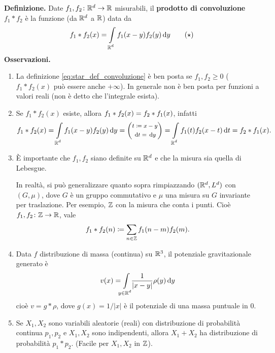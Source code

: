 \documentclass[a4paper, 12pt]{report}
\begin{document}
\textbf{Definizione.} Date $f_1,f_2 \colon  \mathbb R^d \to \mathbb R$ misurabili, il \textbf{prodotto di convoluzione} $f_1 \ast f_2$ è la funzione (da $\mathbb R^d$ a $\mathbb R$) data da
%
\begin{equation} \label{eq:star_def_convoluzione}
	f_1 \ast f_2(x) = \int\limits_{\mathclap{\R^d}} f_1(x-y) f_2(y) \dd y
	\tag{$\star$}
\end{equation}
%
\textbf{Osservazioni.}
\begin{enumerate}
\item La definizione \eqref{eq:star_def_convoluzione} è ben posta se $f_1,f_2 \geq 0$ ($f_1 \ast f_2(x)$ può essere anche $+\infty$).
In generale non è ben posta per funzioni a valori reali (non è detto che l'integrale esista).

\item Se $f_1 \ast f_2(x)$ esiste, allora $\displaystyle f_1 \ast f_2(x) = f_2 \ast f_1(x)$, infatti
%
$$
f_1 \ast f_2 (x) 
= \int\limits_{\mathclap{\R^d}} f_1(x-y) f_2(y) \dd y 
= \left( 
{\footnotesize \begin{gathered}
	t \coloneqq x - y \\ 
	\dd t = \dd y
\end{gathered}}
\right) =
\int\limits_{\mathclap{\R^d}} f_1(t) f_2(x-t) \dd t 
= f_2 \ast f_1(x).
$$
%

\item È importante che $f_1,f_2$ siano definite su $\mathbb R^d$ e che la misura sia quella di Lebesgue.

In realtà, si può generalizzare quanto sopra rimpiazzando $(\mathbb R^d, L^d)$ con $(G,\mu)$, dove $G$ è un gruppo commutativo e $\mu$ una misura su $G$ invariante per traslazione. Per esempio, $\mathbb Z$ con la misura che conta i punti. Cioè $f_1,f_2 \colon \mathbb Z \to \mathbb R$, vale
%
$$
f_1 \ast f_2(n) \coloneqq \sum_{n \in \mathbb Z} f_1(n - m) f_2(m).
$$
%

\item Data $f$ distribuzione di massa (continua) su $\mathbb R^3$, il potenziale gravitazionale generato è
%
$$
v(x) = \int\limits_{\mathclap{y \in \R^d}} \frac{1}{\left| x - y \right|} \rho(y) \dd y
$$
%
cioè $v = g \ast \rho$, dove  $g (x) = 1 / \left| x \right|$ è il potenziale di una massa puntuale in $0$.

\item Se $X_1, X_2$ sono variabili aleatorie (reali) con distribuzione di probabilità continua $p_1,p_2$ e $X_1,X_2$ sono indipendenti, allora $X_1 + X_2$ ha distribuzione di probabilità $p_1 \ast p_2$. (Facile per $X_1,X_2$ in $\mathbb Z$).

\end{enumerate}
\end{document}
